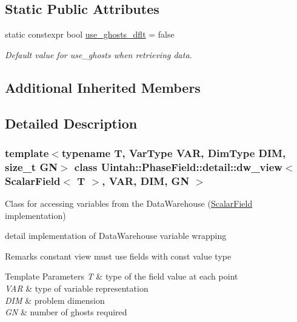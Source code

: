 \subsection*{Static Public Attributes}
\begin{DoxyCompactItemize}
\item 
static constexpr bool \hyperlink{classUintah_1_1PhaseField_1_1detail_1_1dw__view_3_01ScalarField_3_01T_01_4_00_01VAR_00_01DIM_00_01GN_01_4_a6d76ec22f8cb6a0aff18f14f846950b0}{use\+\_\+ghosts\+\_\+dflt} = false
\begin{DoxyCompactList}\small\item\em Default value for use\+\_\+ghosts when retrieving data. \end{DoxyCompactList}\end{DoxyCompactItemize}
\subsection*{Additional Inherited Members}


\subsection{Detailed Description}
\subsubsection*{template$<$typename T, Var\+Type V\+AR, Dim\+Type D\+IM, size\+\_\+t GN$>$\newline
class Uintah\+::\+Phase\+Field\+::detail\+::dw\+\_\+view$<$ Scalar\+Field$<$ T $>$, V\+A\+R, D\+I\+M, G\+N $>$}

Class for accessing variables from the Data\+Warehouse (\hyperlink{structUintah_1_1PhaseField_1_1ScalarField}{Scalar\+Field} implementation) 

detail implementation of Data\+Warehouse variable wrapping

\begin{DoxyRemark}{Remarks}
constant view must use fields with const value type
\end{DoxyRemark}

\begin{DoxyTemplParams}{Template Parameters}
{\em T} & type of the field value at each point \\
\hline
{\em V\+AR} & type of variable representation \\
\hline
{\em D\+IM} & problem dimension \\
\hline
{\em GN} & number of ghosts required \\
\hline
\end{DoxyTemplParams}


